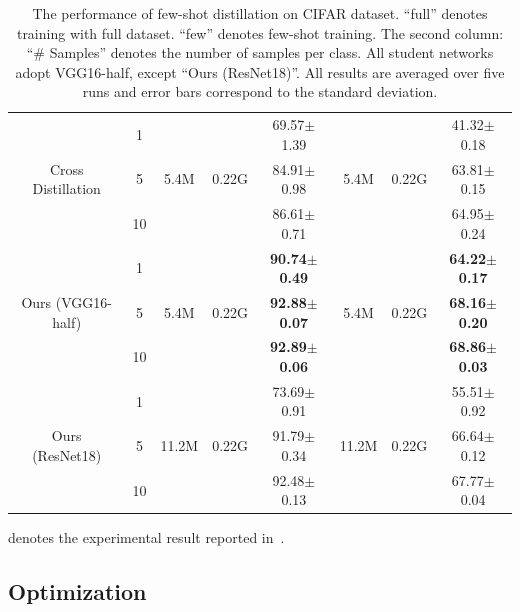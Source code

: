 \documentclass[letterpaper]{article} %
\begin{document}
{{\begin{table}[ht]
\begin{threeparttable}
{\begin{tabular}{c|c|ccc|ccc}
        \hline
                & 1     &         &         & 69.57$\pm$1.39          &         &         & 41.32$\pm$0.18 \\
        Cross Distillation
                & 5     & 5.4M    & 0.22G   & 84.91$\pm$0.98          & 5.4M    & 0.22G   & 63.81$\pm$0.15 \\
                & 10    &         &         & 86.61$\pm$0.71          &         &         & 64.95$\pm$0.24 \\
        \hline
                & 1     &         &         & \textbf{90.74$\pm$0.49}          &         &         & \textbf{64.22$\pm$0.17} \\
        Ours (VGG16-half)
                & 5     & 5.4M    & 0.22G   & \textbf{92.88$\pm$0.07}          & 5.4M    & 0.22G   & \textbf{68.16$\pm$0.20} \\
                & 10    &         &         & \textbf{92.89$\pm$0.06} &         &         & \textbf{68.86$\pm$0.03} \\
        \hline
                & 1     &         &         & 73.69$\pm$0.91          &         &         & 55.51$\pm$0.92 \\
        Ours (ResNet18)
                & 5     & 11.2M   & 0.22G   & 91.79$\pm$0.34          & 11.2M   & 0.22G   & 66.64$\pm$0.12 \\
                & 10    &         &         & 92.48$\pm$0.13          &         &         & 67.77$\pm$0.04 \\
        \hline
        \end{tabular}
        }
    \begin{tablenotes}
    \item[$\dag$] denotes the experimental result reported in~\cite{li2018few}.
    \end{tablenotes}
    
    \caption{The performance of few-shot distillation on CIFAR dataset.
            ``full'' denotes training with full dataset. ``few'' denotes few-shot training.
            The second column: ``\# Samples'' denotes the number of samples per class. All student networks adopt VGG16-half, except ``Ours (ResNet18)''.
            All results are averaged over five runs and error bars correspond to the standard deviation.}
    \label{table:cifar}
    \end{threeparttable}
    \end{table}
}

    \subsection{Optimization}
    {


}}
\end{document}
